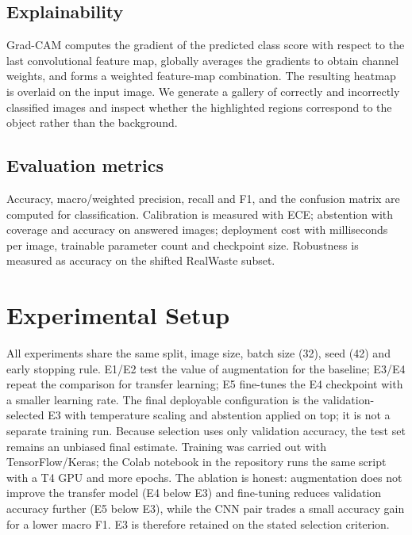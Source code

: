 \documentclass[11pt,a4paper]{article}
\begin{document}
\subsection{Explainability}
Grad-CAM computes the gradient of the predicted class score with respect to the last
convolutional feature map, globally averages the gradients to obtain channel weights, and
forms a weighted feature-map combination. The resulting heatmap is overlaid on the input
image. We generate a gallery of correctly and incorrectly classified images and inspect
whether the highlighted regions correspond to the object rather than the background.

\subsection{Evaluation metrics}
Accuracy, macro/weighted precision, recall and F1, and the confusion matrix are computed
for classification. Calibration is measured with ECE; abstention with coverage and accuracy
on answered images; deployment cost with milliseconds per image, trainable parameter count
and checkpoint size. Robustness is measured as accuracy on the shifted RealWaste subset.

\section{Experimental Setup}
\label{sec:setup}

\experimentTable

All experiments share the same split, image size, batch size (32), seed (42) and early
stopping rule. E1/E2 test the value of augmentation for the baseline; E3/E4 repeat the
comparison for transfer learning; E5 fine-tunes the E4 checkpoint with a smaller learning
rate. The final deployable configuration is the validation-selected E3 with temperature
scaling and abstention applied on top; it is not a separate training run. Because selection
uses only validation accuracy, the test set remains an unbiased final estimate. Training
was carried out with TensorFlow/Keras; the Colab notebook in the repository runs the same
script with a T4 GPU and more epochs. The ablation is honest: augmentation does not improve
the transfer model (E4 below E3) and fine-tuning reduces validation accuracy further (E5
below E3), while the CNN pair trades a small accuracy gain for a lower macro F1. E3 is
therefore retained on the stated selection criterion.
\end{document}
